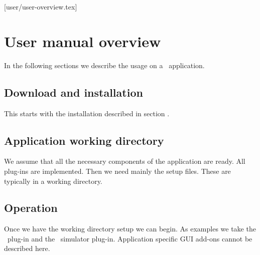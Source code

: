 [user/user-overview.tex]
\section{User manual overview}
In the following sections we describe the usage on a \dabc\ application.
\subsection{Download and installation}
This starts with the installation described in section .
\subsection{Application working directory}
We assume that all the necessary components of the application are ready.
All plug-ins are implemented. Then we need mainly the setup files.
These are typically in a working directory.
\subsection{Operation}
Once we have the working directory setup we can begin.
As examples we take the \mbs\ plug-in and the \dabc\ simulator plug-in.
Application specific GUI add-ons cannot be described here.

